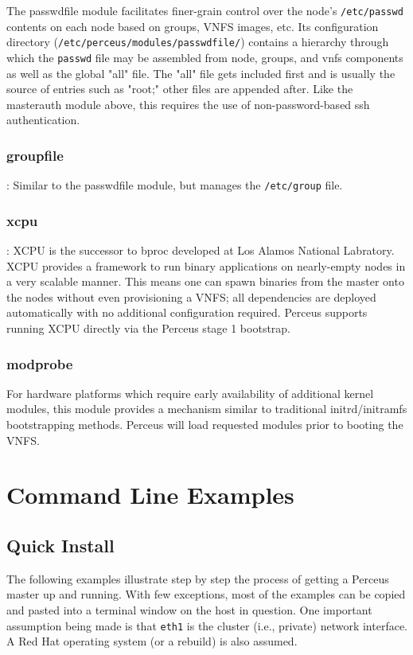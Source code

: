 \documentclass[10pt,letterpaper]{report}
\begin{document}
The passwdfile module facilitates finer-grain control over the node's
{\tt /etc/passwd} contents on each node based on groups, VNFS images, etc.
Its configuration directory ({\tt /etc/perceus/modules/passwdfile/}) contains
a hierarchy through which the {\tt passwd} file may be assembled from node,
groups, and vnfs components as well as the global "all" file.  The "all" file
gets included first and is usually the source of entries such as "root;" other
files are appended after.  Like the masterauth module above, this requires
the use of non-password-based ssh authentication.

\subsection{groupfile}:
Similar to the passwdfile module, but manages the {\tt /etc/group} file.

\subsection{xcpu}:
XCPU is the successor to bproc developed at Los Alamos National Labratory.
XCPU provides a framework to run binary applications on nearly-empty nodes in
a very scalable manner.  This means one can spawn binaries from the master
onto the nodes without even provisioning a VNFS; all dependencies are deployed
automatically with no additional configuration required.  Perceus supports
running XCPU directly via the Perceus stage 1 bootstrap.

\subsection{modprobe}
For hardware platforms which require early availability of additional kernel
modules, this module provides a mechanism similar to traditional
initrd/initramfs bootstrapping methods.  Perceus will load requested modules
prior to booting the VNFS.

\chapter{Command Line Examples}

\section{Quick Install}

The following examples illustrate step by step the process of getting a
Perceus master up and running.  With few exceptions, most of the examples can
be copied and pasted into a terminal window on the host in question.  One
important assumption being made is that {\tt eth1} is the cluster (i.e.,
private) network interface.  A Red Hat operating system (or a rebuild) is also
assumed.
\end{document}
